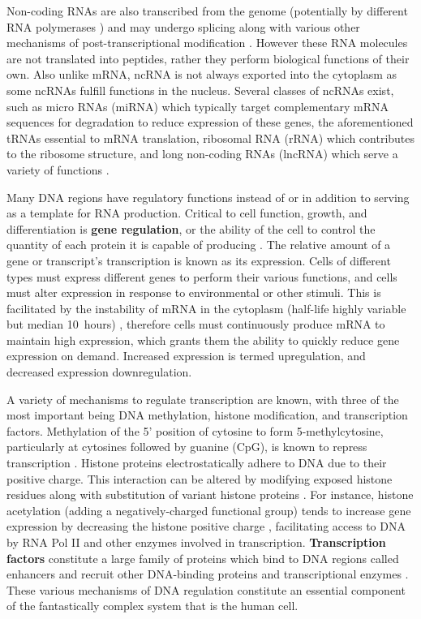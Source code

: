 Non-coding RNAs are also transcribed from the genome (potentially by different RNA polymerases \cite{turowski2016}) and may undergo splicing \cite{krchnakova2018} along with various other mechanisms of post-transcriptional modification \cite{leighton2018}. However these RNA molecules are not translated into peptides, rather they perform biological functions of their own. Also unlike mRNA, ncRNA is not always exported into the cytoplasm as some ncRNAs fulfill functions in the nucleus. Several classes of ncRNAs exist, such as micro RNAs (miRNA) which typically target complementary mRNA sequences for degradation to reduce expression of these genes, the aforementioned tRNAs essential to mRNA translation, ribosomal RNA (rRNA) which contributes to the ribosome structure, and long non-coding RNAs (lncRNA) which serve a variety of functions \cite{slack2019}.

Many DNA regions have regulatory functions instead of or in addition to serving as a template for RNA production. Critical to cell function, growth, and differentiation is \textbf{gene regulation}, or the ability of the cell to control the quantity of each protein it is capable of producing \cite{guo2014}. The relative amount of a gene or transcript's transcription is known as its expression. Cells of different types must express different genes to perform their various functions, and cells must alter expression in response to environmental or other stimuli. This is facilitated by the instability of mRNA in the cytoplasm (half-life highly variable but median \textapprox{}10~hours) \cite{yang2003}, therefore cells must continuously produce mRNA to maintain high expression, which grants them the ability to quickly reduce gene expression on demand. Increased expression is termed upregulation, and decreased expression downregulation.

A variety of mechanisms to regulate transcription are known, with three of the most important being DNA methylation, histone modification, and transcription factors. Methylation of the 5' position of cytosine to form 5-methylcytosine, particularly at cytosines followed by guanine (CpG), is known to repress transcription \cite{jin2011}. Histone proteins electrostatically adhere to DNA due to their positive charge. This interaction can be altered by modifying exposed histone residues along with substitution of variant histone proteins \cite{greer2012,ernst2010,bonneville2012}. For instance, histone acetylation (adding a negatively-charged functional group) tends to increase gene expression by decreasing the histone positive charge \cite{eberharter2002}, facilitating access to DNA by RNA Pol II and other enzymes involved in transcription. \textbf{Transcription factors} constitute a large family of proteins which bind to DNA regions called enhancers and recruit other DNA-binding proteins and transcriptional enzymes \cite{spitz2012}. These various mechanisms of DNA regulation constitute an essential component of the fantastically complex system that is the human cell.

